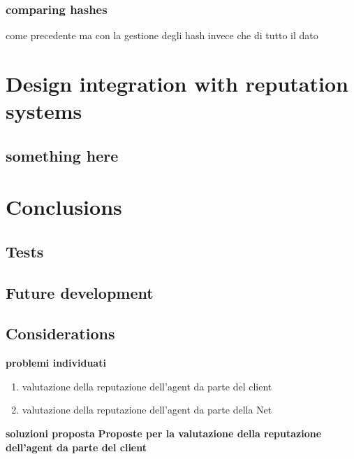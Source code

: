 \documentclass[]{article}
\begin{document}
		\subsubsection{comparing hashes}
		come precedente ma con la gestione degli hash invece che di tutto il dato
	\section{Design integration with reputation systems}
	
	\subsection{something here}
	
		
\section{Conclusions}
	\subsection{Tests}
	\subsection{Future development}
	\subsection{Considerations}

	\pagebreak

	\textbf{problemi individuati}
	\begin{enumerate}
		\item valutazione della reputazione dell'agent da parte del client
		\item valutazione della reputazione dell'agent da parte della Net
	\end{enumerate}
	
	\textbf{soluzioni proposta}
	\textbf{Proposte per la valutazione della reputazione dell'agent da parte del client}
	
\end{document}
